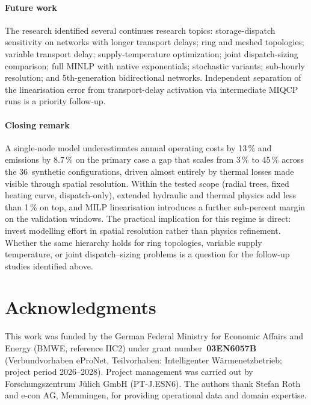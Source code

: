 \documentclass[a4paper,fleqn]{cas-dc}
\begin{document}
\paragraph{Future work}
The research identified several continues research topics: storage-dispatch sensitivity on networks with longer transport delays; ring and meshed topologies; variable transport delay; supply-temperature optimization; joint dispatch-sizing comparison; full MINLP with native exponentials; stochastic variants; sub-hourly resolution; and 5th-generation bidirectional networks. Independent separation of the linearisation error from transport-delay activation via intermediate MIQCP runs is a
priority follow-up.

\paragraph{Closing remark}
A single-node model underestimates annual operating costs by
13\,\% and  emissions by 8.7\,\% on the primary
case a gap that scales from 3\,\% to 45\,\% across the
36~synthetic configurations, driven almost entirely by thermal losses made
visible through spatial resolution. Within the tested scope
(radial trees, fixed heating curve, dispatch-only), extended
hydraulic and thermal physics add less than 1\,\% on top, and
MILP linearisation introduces a further sub-percent margin on the
validation windows. The practical implication for this regime is
direct: invest modelling effort in spatial resolution rather than
physics refinement. Whether the same hierarchy holds for ring
topologies, variable supply temperature, or joint
dispatch--sizing problems is a question for the follow-up
studies identified above.

\section*{Acknowledgments}
This work was funded by the German Federal Ministry for Economic
Affairs and Energy (BMWE, reference IIC2) under grant
number~\textbf{03EN6057B} (Verbundvorhaben eProNet, Teilvorhaben:
Intelligenter W\"armenetzbetrieb; project period 2026--2028).
Project management was carried out by Forschungszentrum J\"ulich
GmbH (PT-J.ESN6). The authors thank Stefan Roth and e-con AG,
Memmingen, for providing operational data and domain expertise.

\end{document}
